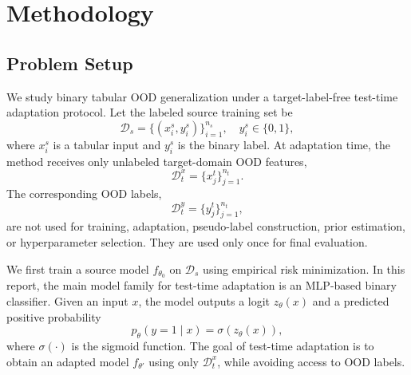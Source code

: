 \documentclass{article}
\begin{document}

\section{Methodology}

\subsection{Problem Setup}

We study binary tabular OOD generalization under a target-label-free test-time adaptation protocol. Let the labeled source training set be
\begin{equation}
\mathcal{D}_{s}
=
\{(x_i^{s}, y_i^{s})\}_{i=1}^{n_s},
\quad y_i^{s} \in \{0,1\},
\label{eq:source_data}
\end{equation}
where $x_i^{s}$ is a tabular input and $y_i^{s}$ is the binary label. At adaptation time, the method receives only unlabeled target-domain OOD features,
\begin{equation}
\mathcal{D}_{t}^{x}
=
\{x_j^{t}\}_{j=1}^{n_t}.
\label{eq:target_features}
\end{equation}
The corresponding OOD labels,
\begin{equation}
\mathcal{D}_{t}^{y}
=
\{y_j^{t}\}_{j=1}^{n_t},
\label{eq:target_labels}
\end{equation}
are not used for training, adaptation, pseudo-label construction, prior estimation, or hyperparameter selection. They are used only once for final evaluation.

We first train a source model $f_{\theta_0}$ on $\mathcal{D}_{s}$ using empirical risk minimization. In this report, the main model family for test-time adaptation is an MLP-based binary classifier. Given an input $x$, the model outputs a logit $z_\theta(x)$ and a predicted positive probability
\begin{equation}
p_{\theta}(y=1 \mid x) = \sigma\!\left(z_{\theta}(x)\right),
\label{eq:positive_probability}
\end{equation}
where $\sigma(\cdot)$ is the sigmoid function. The goal of test-time adaptation is to obtain an adapted model $f_{\theta'}$ using only $\mathcal{D}_{t}^{x}$, while avoiding access to OOD labels.
\end{document}
